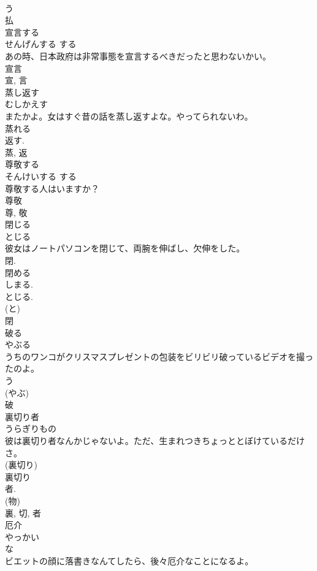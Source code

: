 \documentclass[8pt]{extreport}
\begin{document}
\begin{CJK}{UTF8}{min}
\\	う 
\\	払	
\\	宣言する	
\\	せんげんする	する 
\\	あの時、日本政府は非常事態を宣言するべきだったと思わないかい。	
\\	宣言 
\\	宣, 言	
\\	蒸し返す	
\\	むしかえす	
\\	またかよ。女はすぐ昔の話を蒸し返すよな。やってられないわ。	
\\	蒸れる 
\\	返す. 
\\	蒸, 返	
\\	尊敬する	
\\	そんけいする	する 
\\	尊敬する人はいますか？	
\\	尊敬 
\\	尊, 敬	
\\	閉じる	
\\	とじる	
\\	彼女はノートパソコンを閉じて、両腕を伸ばし、欠伸をした。	
\\	閉.	
\\	閉める 
\\	しまる. 
\\	とじる. 
\\	(と) 
\\	閉	
\\	破る	
\\	やぶる	
\\	うちのワンコがクリスマスプレゼントの包装をビリビリ破っているビデオを撮ったのよ。	
\\	う 
\\	(やぶ) 
\\	破	
\\	裏切り者	
\\	うらぎりもの	
\\	彼は裏切り者なんかじゃないよ。ただ、生まれつきちょっととぼけているだけさ。	
\\	(裏切り) 
\\	裏切り 
\\	者. 
\\	(物) 
\\	裏, 切, 者	
\\	厄介	
\\	やっかい	
\\	な 
\\	ビエットの顔に落書きなんてしたら、後々厄介なことになるよ。	

\end{CJK}
\end{document}
